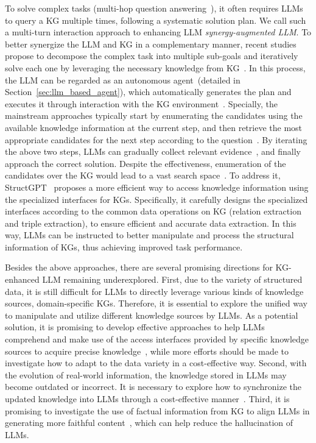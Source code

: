 {
{
To solve complex tasks (\eg multi-hop question answering~\cite{Lan-2021-arxiv-Complex}), it often requires LLMs to query a KG multiple times, following a systematic solution plan. 
We call such a multi-turn interaction approach to enhancing LLM \emph{synergy-augmented LLM}.   
To better synergize the LLM and KG in a complementary manner, recent studies propose to decompose the complex task into multiple sub-goals and iteratively solve each one by leveraging the necessary knowledge from KG~\cite{Jiang-2023-arxiv-StructGPT, Gu-ACL-23-Pangu, Luo-arxiv-23-Reasoning}.
In this process, the LLM can be regarded as an autonomous agent~(detailed in Section~\ref{sec:llm_based_agent}), which automatically generates the plan and executes it through interaction with the KG environment~\cite{Gu-ACL-23-Pangu}. 
{Specially, the mainstream approaches typically start by enumerating the candidates   using the available knowledge information at the current step, and then retrieve the most appropriate candidates for the next step according to the question~\cite{Gu-ACL-23-Pangu, Luo-arxiv-23-Reasoning}.} 
By iterating the above two steps, LLMs can gradually collect relevant evidence~\cite{Gu-ACL-23-Pangu,Luo-arxiv-23-Reasoning}, and finally approach the correct solution.  %
{
Despite the effectiveness, enumeration of the candidates over the KG would lead to a vast search space~\cite{Lan-2020-ACL-Query}.} 
To address it, StructGPT~\cite{Jiang-2023-arxiv-StructGPT} proposes a more efficient way to access knowledge information using the specialized interfaces for KGs.
Specifically, it carefully designs the specialized interfaces according to the common data operations on KG (\eg relation extraction and triple extraction), to ensure efficient and accurate data extraction. 
In this way, LLMs can be instructed to better manipulate and process the structural information of KGs, thus achieving improved task performance. 
}

{
Besides the above approaches, there are several promising directions for KG-enhanced LLM remaining underexplored. 
{
First, due to the variety of structured data, it is still difficult for LLMs to directly leverage various kinds of knowledge sources, \eg domain-specific KGs. 
Therefore, it is essential to explore the unified way to manipulate and utilize different knowledge sources by LLMs. 
As a potential solution, it is promising to develop effective approaches to help LLMs comprehend and make use of the access interfaces provided by specific knowledge sources to acquire precise knowledge~\cite{Jiang-2023-arxiv-StructGPT}, while more efforts should be made to investigate how to adapt to the data variety in a cost-effective way. 
}
Second, with the evolution of real-world information, the knowledge stored in LLMs may become outdated or incorrect.
It is necessary to explore how to synchronize the updated knowledge into LLMs through a cost-effective manner~\cite{Wang-arxiv-23-easyedit, Yao-arxiv-23-editing}.
Third, it is promising to investigate the use of factual information from KG to align LLMs in generating more faithful content~\cite{Choi-arxiv-23-KCTs, Zhang-arxiv-23-Mitigating}, which can help reduce the hallucination of LLMs.
}

}
